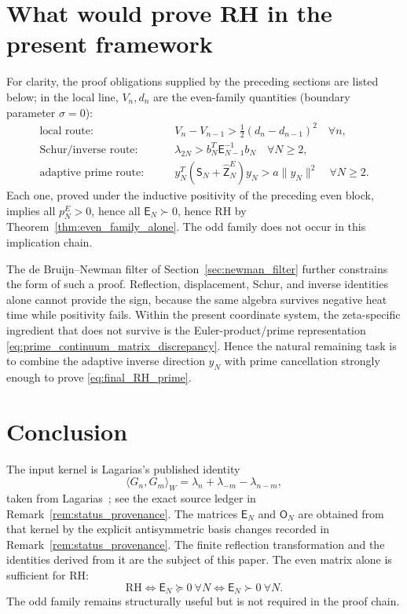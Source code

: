 \documentclass[11pt]{amsart}
\numberwithin{equation}{section}
\theoremstyle{plain}
\theoremstyle{definition}
\theoremstyle{remark}
\newcommand{\RH}{\mathrm{RH}}
\newcommand{\E}{\mathsf E}
\newcommand{\Omat}{\mathsf O}
\begin{document}
\section{What would prove RH in the present framework}
\label{sec:what_proves_RH}

For clarity, the proof obligations supplied by the preceding sections are listed below; in the local line, \(V_n,d_n\) are the even-family quantities (boundary parameter \(\sigma=0\)):
\begin{align}
\text{local route:}\qquad&
V_n-V_{n-1}>\frac12(d_n-d_{n-1})^2
\quad\forall n,
\label{eq:final_RH_local}\\
\text{Schur/inverse route:}\qquad&
\lambda_{2N}>
b_N^T\E_{N-1}^{-1}b_N
\quad\forall N\ge2,
\label{eq:final_RH_schur}\\
\text{adaptive prime route:}\qquad&
y_N^T(\mathsf S_N+\widehat{\mathsf Z}_N^E)y_N
>
a\|y_N\|^2
\quad\forall N\ge2.
\label{eq:final_RH_prime}
\end{align}
Each one, proved under the inductive positivity of the preceding even block, implies all
\(p_N^E>0\), hence all \(\E_N\succ0\), hence RH by
Theorem~\ref{thm:even_family_alone}.  The odd family does not occur in this implication chain.

The de Bruijn--Newman filter of Section~\ref{sec:newman_filter} further constrains the form of such
a proof.  Reflection, displacement, Schur, and inverse identities alone cannot provide the sign,
because the same algebra survives negative heat time while positivity fails.  Within the present
coordinate system, the zeta-specific ingredient that does not survive is the Euler-product/prime
representation \eqref{eq:prime_continuum_matrix_discrepancy}.  Hence the natural remaining task is
to combine the adaptive inverse direction \(y_N\) with prime cancellation strongly enough to prove
\eqref{eq:final_RH_prime}.

\section{Conclusion}
\label{sec:conclusion}

The input kernel is Lagarias's published identity
\[
\langle G_n,G_m\rangle_W=\lambda_n+\lambda_{-m}-\lambda_{n-m},
\]
taken from Lagarias~\cite[Section~3, Theorem~3.1]{Lagarias2007}; see the exact source ledger in
Remark~\ref{rem:status_provenance}.  The matrices \(\E_N\) and \(\Omat_N\) are obtained
from that kernel by the explicit antisymmetric basis changes recorded in Remark~\ref{rem:status_provenance}.
The finite reflection transformation and the identities derived from it are the subject of this paper.  The even matrix
alone is sufficient for RH:
\[
\RH\Longleftrightarrow \E_N\succeq0\ \forall N
\Longleftrightarrow \E_N\succ0\ \forall N.
\]
The odd family remains structurally useful but is not required in the proof chain.
\end{document}
